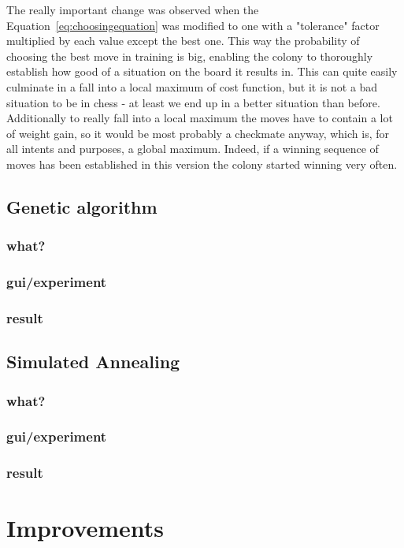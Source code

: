 \documentclass[pdftex]{article}
\begin{document}
The really important change was observed when the Equation~\ref{eq:choosingequation} was modified to one with a "tolerance" factor multiplied by each value except the best one. This way the probability of choosing the best move in training is big, enabling  the colony to thoroughly establish how good of a situation on the board it results in. This can quite easily culminate in a fall into a local maximum of cost function, but it is not a bad situation to be in chess - at least we end up in a better situation than before. Additionally to really fall into a local maximum the moves have to contain a lot of weight gain, so it would be most probably a checkmate anyway, which is, for all intents and purposes, a global maximum. Indeed, if a winning sequence of moves has been established in this version the colony started winning very often.

\subsection{Genetic algorithm}
\label{sec:genetic}

\subsubsection{what?}
\subsubsection{gui/experiment}
\subsubsection{result}

\subsection{Simulated Annealing}
\label{sec:annealing}

\subsubsection{what?}
\subsubsection{gui/experiment}
\subsubsection{result}

\section{Improvements}
\label{sec:improvements}
\end{document}
